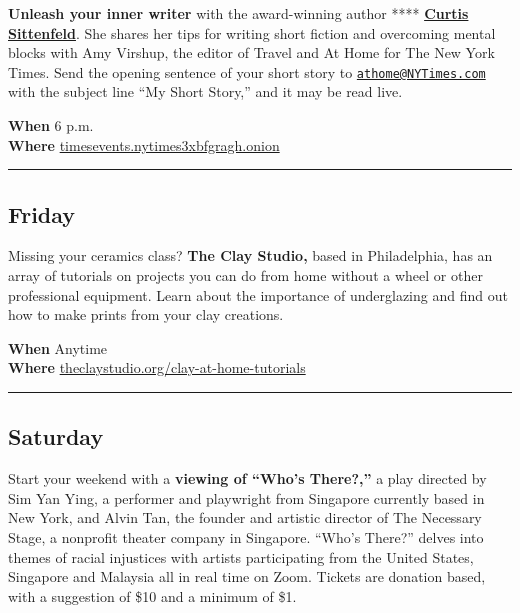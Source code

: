 \textbf{Unleash your inner writer} with the award-winning author ****
\textbf{\href{https://www.nytimes3xbfgragh.onion/2020/07/18/at-home/coronavirus-fiction-writing.html}{Curtis
Sittenfeld}}. She shares her tips for writing short fiction and
overcoming mental blocks with Amy Virshup, the editor of Travel and At
Home for The New York Times. Send the opening sentence of your short
story to
\href{mailto:athome@NYTimes.com}{\nolinkurl{athome@NYTimes.com}} with
the subject line ``My Short Story,'' and it may be read live.

\textbf{When} 6 p.m.\\
\textbf{Where}
\href{https://timesevents.nytimes3xbfgragh.onion/astorywritingclasswithcurtissittenfeld}{timesevents.nytimes3xbfgragh.onion}

\begin{center}\rule{0.5\linewidth}{\linethickness}\end{center}

\hypertarget{friday}{%
\subsection{Friday}\label{friday}}

Missing your ceramics class? \textbf{The Clay Studio,} based in
Philadelphia, has an array of tutorials on projects you can do from home
without a wheel or other professional equipment. Learn about the
importance of underglazing and find out how to make prints from your
clay creations.

\textbf{When} Anytime\\
\textbf{Where}
\href{https://www.theclaystudio.org/clay-at-home-tutorials}{theclaystudio.org/clay-at-home-tutorials}

\begin{center}\rule{0.5\linewidth}{\linethickness}\end{center}

\hypertarget{saturday}{%
\subsection{Saturday}\label{saturday}}

Start your weekend with a \textbf{viewing of ``Who's There?,''} a play
directed by Sim Yan Ying, a performer and playwright from Singapore
currently based in New York, and Alvin Tan, the founder and artistic
director of The Necessary Stage, a nonprofit theater company in
Singapore. ``Who's There?'' delves into themes of racial injustices with
artists participating from the United States, Singapore and Malaysia all
in real time on Zoom. Tickets are donation based, with a suggestion of
\$10 and a minimum of \$1.

